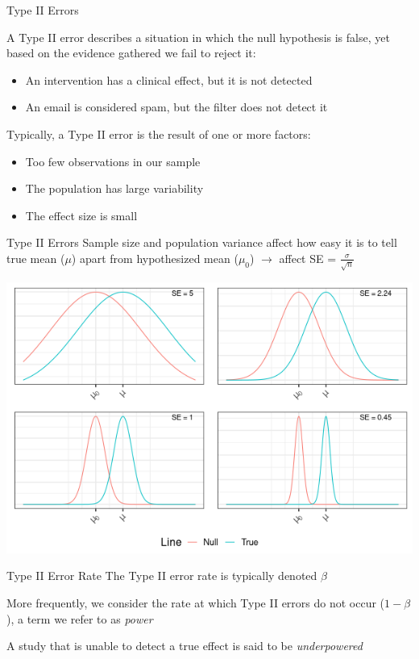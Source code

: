 \documentclass{beamer}
\begin{document}
\begin{frame}{Type II Errors}

A Type II error describes a situation in which the null hypothesis is false, yet based on the evidence gathered we fail to reject it:
\begin{itemize}
\item An intervention has a clinical effect, but it is not detected
\item An email is considered spam, but the filter does not detect it
\end{itemize}

\vspace{6mm}

Typically, a Type II error is the result of one or more factors:
\begin{itemize}
\item Too few observations in our sample
\item The population has large variability
\item The effect size is small
\end{itemize}

\end{frame}

\begin{frame}{Type II Errors}
Sample size and population variance affect how easy it is to tell true mean ($\mu$) apart from hypothesized mean ($\mu_0$) $\rightarrow$ affect SE = $\frac{\sigma}{\sqrt{n}}$
\begin{center}
\includegraphics[scale=0.49]{null_plotter.png}
\end{center}
\end{frame}

\begin{frame}{Type II Error Rate}
The Type II error rate is typically denoted $\beta$ \vspace{4mm}

More frequently, we consider the rate at which Type II errors do not occur ($1 - \beta$), a term we refer to as \textit{power} \vspace{4mm}

A study that is unable to detect a true effect is said to be \textit{underpowered}
\end{frame}
\end{document}
